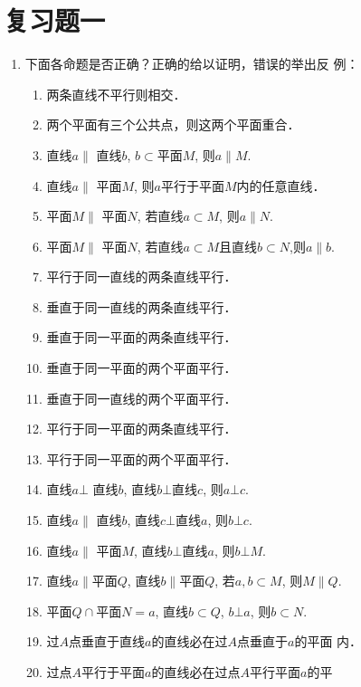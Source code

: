 \begin{figure}[htp]
    \centering
    
    \caption{}
\end{figure}


\section*{复习题一}

\begin{enumerate}
    \item 下面各命题是否正确？正确的给以证明，错误的举出反
    例：
\begin{enumerate}[(1)]
\item 两条直线不平行则相交．
\item 两个平面有三个公共点，则这两个平面重合．
\item 直线$a\parallel$ 直线$b$, $b\subset$平面$M$, 则$a\parallel M$.
\item 直线$a\parallel$ 平面$M$, 则$a$平行于平面$M$内的任意直线．
\item 平面$M\parallel$ 平面$N$, 若直线$a\subset M$, 则$a\parallel N$.
\item 平面$M\parallel$ 平面$N$, 若直线$a\subset M$且直线$b\subset N$,则$a\parallel b$.
\item 平行于同一直线的两条直线平行．
\item 垂直于同一直线的两条直线平行．
\item 垂直于同一平面的两条直线平行．
\item 垂直于同一平面的两个平面平行．
\item 垂直于同一直线的两个平面平行．
\item 平行于同一平面的两条直线平行．
\item 平行于同一平面的两个平面平行．
\item 直线$a\bot$ 直线$b$, 直线$b\bot $直线$c$, 则$a\bot c$.
\item 直线$a\parallel$ 直线$b$, 直线$c\bot $直线$a$, 则$b\bot c$.
\item 直线$a\parallel$ 平面$M$, 直线$b\bot $直线$a$, 则$b\bot M$.
\item 直线$a\parallel $平面$Q$, 直线$b\parallel $平面$Q$, 若$a,b\subset M$, 则$M\parallel Q$.
\item 平面$Q\cap $平面$N=a$, 直线$b\subset Q$, $b\bot a$, 则$b\subset N$.
\item 过$A$点垂直于直线$a$的直线必在过$A$点垂直于$a$的平面
内．
\item 过点$A$平行于平面$a$的直线必在过点$A$平行平面$a$的平

\end{enumerate}
\end{enumerate}
